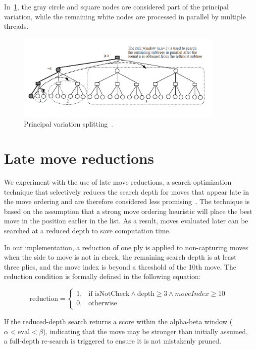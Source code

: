 \vspace{1em}

\noindent In~\cref{fig:pvsplitting}, the gray circle and square nodes are considered part of the principal variation, while the remaining white nodes are processed in parallel by multiple threads.

\begin{figure}
   \centering
   \includegraphics[width=0.9\textwidth]{Imagenes/Bitmap/pvsplitting.png}
   \caption{Principal variation splitting~\cite{PVSplitting}.}\label{fig:pvsplitting}
\end{figure}

\section{Late move reductions}

\noindent We experiment with the use of late move reductions, a search optimization technique that selectively reduces the search depth for moves that appear late in the move ordering and are therefore considered less promising~\cite{LateMoveReductions}. The technique is based on the assumption that a strong move ordering heuristic will place the best move in the position earlier in the list. As a result, moves evaluated later can be searched at a reduced depth to save computation time.

\vspace{1em}

\par
In our implementation, a reduction of one ply is applied to non-capturing moves when the side to move is not in check, the remaining search depth is at least three plies, and the move index is beyond a threshold of the 10th move. The reduction condition is formally defined in the following equation:

\begin{equation*}
\text{reduction} = 
\begin{cases}
1, & \text{if } \text{isNotCheck} \wedge \text{depth} \geq 3 \wedge moveIndex \geq 10 \\
0, & \text{otherwise}
\end{cases}
\end{equation*}

\vspace{1em}

\par
If the reduced-depth search returns a score within the alpha-beta window ($\alpha < \text{eval} < \beta$), indicating that the move may be stronger than initially assumed, a full-depth re-search is triggered to ensure it is not mistakenly pruned.


